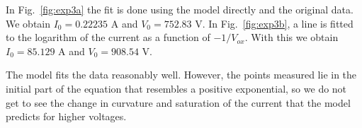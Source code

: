 In Fig.~\ref{fig:exp3a} the fit is done using the model directly and the original data. We obtain $I_0=0.22235$ A and $V_{0}=752.83$ V. In Fig.~\ref{fig:exp3b}, a line is fitted to the logarithm of the current as a function of $-1/V_{ox}$. With this we obtain $I_0=85.129$ A and $V_{0}=908.54$ V.

The model fits the data reasonably well. However, the points measured lie in the initial part of the equation that resembles a positive exponential, so we do not get to see the change in curvature and saturation of the current that the model predicts for higher voltages. 



